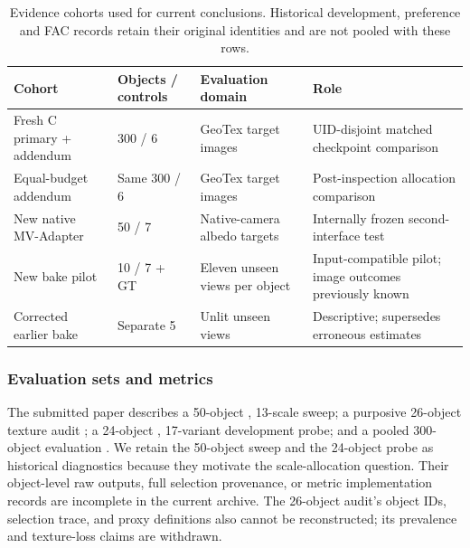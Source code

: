 \documentclass[times,twocolumn,final]{elsarticle}
\providecommand{\DIFadd}[1]{{\protect\color{blue} \sf #1}} %
\providecommand{\DIFaddbegin}{} %
\providecommand{\DIFaddend}{} %
\providecommand{\DIFaddFL}[1]{\DIFadd{#1}} %
\renewcommand{\DIFaddFL}[1]{#1}
\begin{document}
\DIFaddbegin \begin{table}[t]\centering\scriptsize
\caption{Evidence cohorts used for current conclusions. Historical development, preference and FAC records retain their original identities and are not pooled with these rows.}
\label{tab:cohort-map}
\begin{tabular}{llll}
\toprule \DIFaddFL{Cohort }& \DIFaddFL{Objects / controls }& \DIFaddFL{Evaluation domain }& \DIFaddFL{Role }\\
\midrule
\DIFaddFL{Fresh C primary + addendum }& \DIFaddFL{300 / 6 }& \DIFaddFL{GeoTex target images }& \DIFaddFL{UID-disjoint matched checkpoint comparison }\\
\DIFaddFL{Equal-budget addendum }& \DIFaddFL{Same 300 / 6 }& \DIFaddFL{GeoTex target images }& \DIFaddFL{Post-inspection allocation comparison }\\
\DIFaddFL{New native MV-Adapter }& \DIFaddFL{50 / 7 }& \DIFaddFL{Native-camera albedo targets }& \DIFaddFL{Internally frozen second-interface test }\\
\DIFaddFL{New bake pilot }& \DIFaddFL{10 / 7 + GT }& \DIFaddFL{Eleven unseen views per object }& \DIFaddFL{Input-compatible pilot; image outcomes previously known }\\
\DIFaddFL{Corrected earlier bake }& \DIFaddFL{Separate 5 }& \DIFaddFL{Unlit unseen views }& \DIFaddFL{Descriptive; supersedes erroneous estimates }\\
\bottomrule\end{tabular}
\end{table}

\DIFaddend \subsubsection{Evaluation sets and metrics}

  \DIFaddbegin \DIFadd{The submitted paper describes }\DIFaddend a 50-object  \DIFaddbegin \DIFadd{, 13-scale sweep; a purposive }\DIFaddend 26-object texture audit  \DIFaddbegin \DIFadd{; }\DIFaddend a 24-object  \DIFaddbegin \DIFadd{, 17-variant development probe; and a pooled }\DIFaddend 300-object evaluation  \DIFaddbegin \DIFadd{. We retain the 50-object sweep and }\DIFaddend the 24-object probe   \DIFaddbegin \DIFadd{as historical diagnostics because they motivate the scale-allocation question. Their object-level raw outputs, full selection provenance, or metric implementation records are incomplete in the current archive. The 26-object audit's object IDs, selection trace, and proxy definitions also cannot be reconstructed; its prevalence and texture-loss claims are withdrawn.
}\DIFaddend 
\end{document}
